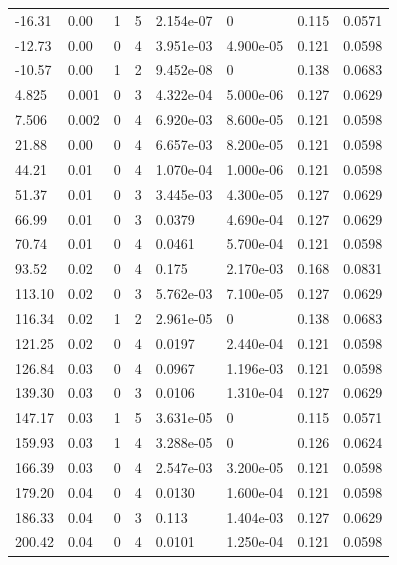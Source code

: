 \documentclass[preview]{standalone}
\begin{document}
{{\begin{tabular}{L{1.2cm}C{1.2cm} C{0.3cm}C{0.5cm} C{1.4cm}C{1.4cm} C{1.4cm}C{1.4cm}}
  -16.31  &  0.00  & 1     &  5 &  2.154e-07  & 0  & 0.115 &  0.0571   \\ 
  -12.73  &  0.00  & 0     &  4 &  3.951e-03  & 4.900e-05  & 0.121 &  0.0598   \\ 
  -10.57  &  0.00  & 1     &  2 &  9.452e-08  & 0  & 0.138 &  0.0683   \\ 
  4.825  &  0.001  & 0     &  3 &  4.322e-04  & 5.000e-06  & 0.127 &  0.0629   \\ 
  7.506  &  0.002  & 0     &  4 &  6.920e-03  & 8.600e-05  & 0.121 &  0.0598   \\ 
  21.88  &  0.00  & 0     &  4 &  6.657e-03  & 8.200e-05  & 0.121 &  0.0598   \\ 
  44.21  &  0.01  & 0     &  4 &  1.070e-04  & 1.000e-06  & 0.121 &  0.0598   \\ 
  51.37  &  0.01  & 0     &  3 &  3.445e-03  & 4.300e-05  & 0.127 &  0.0629   \\ 
  66.99  &  0.01  & 0     &  3 &  0.0379  & 4.690e-04  & 0.127 &  0.0629   \\ 
  70.74  &  0.01  & 0     &  4 &  0.0461  & 5.700e-04  & 0.121 &  0.0598   \\ 
  93.52  &  0.02  & 0     &  4 &  0.175  & 2.170e-03  & 0.168 &  0.0831   \\ 
  113.10  &  0.02  & 0     &  3 &  5.762e-03  & 7.100e-05  & 0.127 &  0.0629   \\ 
  116.34  &  0.02  & 1     &  2 &  2.961e-05  & 0  & 0.138 &  0.0683   \\ 
  121.25  &  0.02  & 0     &  4 &  0.0197  & 2.440e-04  & 0.121 &  0.0598   \\ 
  126.84  &  0.03  & 0     &  4 &  0.0967  & 1.196e-03  & 0.121 &  0.0598   \\ 
  139.30  &  0.03  & 0     &  3 &  0.0106  & 1.310e-04  & 0.127 &  0.0629   \\ 
  147.17  &  0.03  & 1     &  5 &  3.631e-05  & 0  & 0.115 &  0.0571   \\ 
  159.93  &  0.03  & 1     &  4 &  3.288e-05  & 0  & 0.126 &  0.0624   \\ 
  166.39  &  0.03  & 0     &  4 &  2.547e-03  & 3.200e-05  & 0.121 &  0.0598   \\ 
  179.20  &  0.04  & 0     &  4 &  0.0130  & 1.600e-04  & 0.121 &  0.0598   \\ 
  186.33  &  0.04  & 0     &  3 &  0.113  & 1.404e-03  & 0.127 &  0.0629   \\ 
  200.42  &  0.04  & 0     &  4 &  0.0101  & 1.250e-04  & 0.121 &  0.0598   \\ 

\end{tabular}}}
\end{document}
